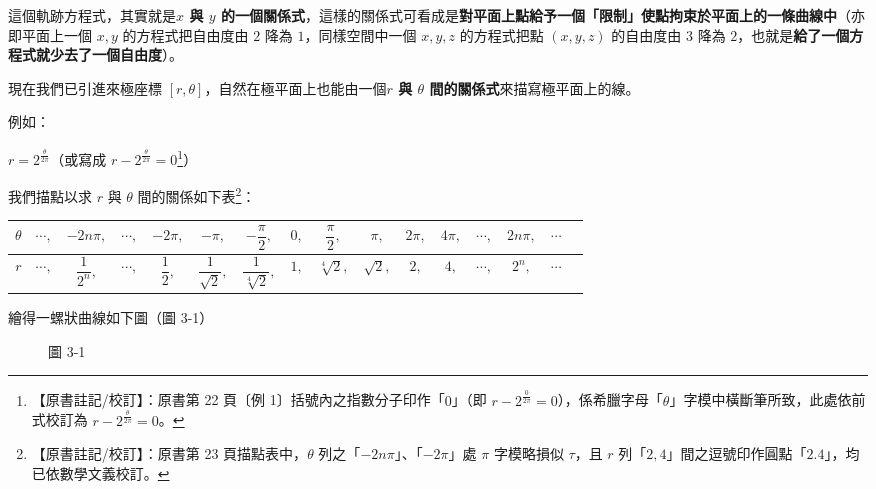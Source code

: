 這個軌跡方程式，其實就是\textbf{$x$ 與 $y$ 的一個關係式}，這樣的關係式可看成是\textbf{對平面上點給予一個「限制」使點拘束於平面上的一條曲線中}（亦即平面上一個 $x, y$ 的方程式把自由度由 $2$ 降為 $1$，同樣空間中一個 $x, y, z$ 的方程式把點 $(x, y, z)$ 的自由度由 $3$ 降為 $2$，也就是\textbf{給了一個方程式就少去了一個自由度}）。

現在我們已引進來極座標 $[r, \theta]$，自然在極平面上也能由一個\textbf{$r$ 與 $\theta$ 間的關係式}來描寫極平面上的線。

例如：

\setcounter{example}{0}
\begin{example}\label{ex:b5s-1-3-1}
$r = 2^{\frac{\theta}{2\pi}}$（或寫成 $r - 2^{\frac{\theta}{2\pi}} = 0$\label{note:b5s-ch1-p22-ex1}\footnote{【原書註記/校訂】：原書第 22 頁〔例 1〕括號內之指數分子印作「$0$」（即 $r - 2^{\frac{0}{2\pi}} = 0$），係希臘字母「$\theta$」字模中橫斷筆所致，此處依前式校訂為 $r - 2^{\frac{\theta}{2\pi}} = 0$。}）

我們描點以求 $r$ 與 $\theta$ 間的關係如下表\label{note:b5s-ch1-p23-table}\footnote{【原書註記/校訂】：原書第 23 頁描點表中，$\theta$ 列之「$-2n\pi$」、「$-2\pi$」處 $\pi$ 字模略損似 $\tau$，且 $r$ 列「$2, 4$」間之逗號印作圓點「$2.4$」，均已依數學文義校訂。}：

\begin{center}
\renewcommand{\arraystretch}{1.6}
\setlength{\tabcolsep}{4pt}
\small
\begin{tabular}{c|ccccccccccccccc}
$\theta$ & $\cdots,$ & $-2n\pi,$ & $\cdots,$ & $-2\pi,$ & $-\pi,$ & $-\dfrac{\pi}{2},$ & $0,$ & $\dfrac{\pi}{2},$ & $\pi,$ & $2\pi,$ & $4\pi,$ & $\cdots,$ & $2n\pi,$ & $\cdots$ \\[4pt]
\hline
$r$ & $\cdots,$ & $\dfrac{1}{2^n},$ & $\cdots,$ & $\dfrac{1}{2},$ & $\dfrac{1}{\sqrt{2}},$ & $\dfrac{1}{\sqrt[4]{2}},$ & $1,$ & $\sqrt[4]{2},$ & $\sqrt{2},$ & $2,$ & $4,$ & $\cdots,$ & $2^n,$ & $\cdots$
\end{tabular}
\end{center}

繪得一螺狀曲線如下圖（圖 3-1）

\begin{figure}[H]
\centering
{}
\caption*{圖 3-1}\label{fig:b5s-1-3-1}
\end{figure}
\end{example}

